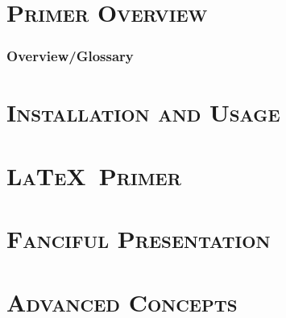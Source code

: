 \def \uswdwmspkg{the \texttt{uswdwms} package}

\pagebreak
\part{\textsc{Primer Overview}}

\pagebreak
\section{Overview/Glossary}
\pagebreak
\part{\textsc{Installation and Usage}}

\pagebreak
\part{\textsc{\LaTeX\ Primer}}

\pagebreak
\part{\textsc{Fanciful Presentation}}

\pagebreak
\part{\textsc{Advanced Concepts}}

\pagebreak

